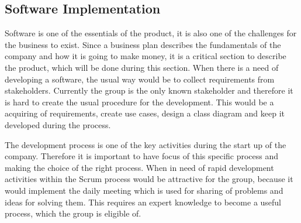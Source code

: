 \subsection{Software Implementation}
Software is one of the essentials of the product, it is also one of the challenges for the business to exist. Since a business plan describes the fundamentals of the company and how it is going to make money, it is a critical section to describe the product, which will be done during this section. When there is a need of developing a software, the usual way would be to collect requirements from stakeholders. Currently the group is the only known stakeholder and therefore it is hard to create the usual procedure for the development. This would be a acquiring of requirements, create use cases, design a class diagram and keep it developed during the process. 

The development process is one of the key activities during the start up of the company. Therefore it is important to have focus of this specific process and making the choice of the right process. When in need of rapid development activities within the Scrum process would be attractive for the group, because it would implement the daily meeting which is used for sharing of problems and ideas for solving them. This requires an expert knowledge to become a useful process, which the group is eligible of.
\clearpage
